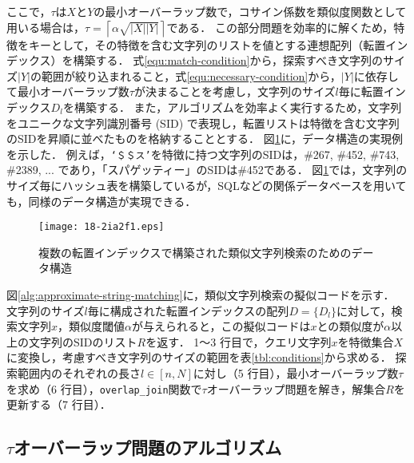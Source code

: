 \documentclass[japanese]{jnlp_JS2.0}
\begin{document}
ここで，$\tau$は$X$と$Y$の最小オーバーラップ数で，コサイン係数を類似度関数として用いる場合は，$\tau = \left\lceil \alpha \sqrt{|X||Y|} \right\rceil$である．
この部分問題を効率的に解くため，特徴をキーとして，その特徴を含む文字列のリストを値とする連想配列（転置インデックス）を構築する．
式\ref{equ:match-condition}から，探索すべき文字列のサイズ$|Y|$の範囲が絞り込まれること，式\ref{equ:necessary-condition}から，$|Y|$に依存して最小オーバーラップ数$\tau$が決まることを考慮し，文字列のサイズ$l$毎に転置インデックス$D_l$を構築する．
また，アルゴリズムを効率よく実行するため，文字列をユニークな文字列識別番号 (SID) で表現し，転置リストは特徴を含む文字列のSIDを昇順に並べたものを格納することとする．
図\ref{fig:data-structure}に，データ構造の実現例を示した．
例えば，\texttt{`＄＄ス'}を特徴に持つ文字列のSIDは，\#267, \#452, \#743, \#2389, ... であり，「スパゲッティー」のSIDは\#452である．
図\ref{fig:data-structure}では，文字列のサイズ毎にハッシュ表を構築しているが，SQLなどの関係データベースを用いても，同様のデータ構造が実現できる．

\begin{figure}[b]
    \begin{center}
\texttt{[image: 18-2ia2f1.eps]}
    \end{center}
    \caption{複数の転置インデックスで構築された類似文字列検索のためのデータ構造}
\label{fig:data-structure}
\end{figure}

図\ref{alg:approximate-string-matching}に，類似文字列検索の擬似コードを示す．
文字列のサイズ$l$毎に構成された転置インデックスの配列$D = \{D_l\}$に対して，検索文字列$x$，類似度閾値$\alpha$が与えられると，この擬似コードは$x$との類似度が$\alpha$以上の文字列のSIDのリスト$R$を返す．
1〜3 行目で，クエリ文字列$x$を特徴集合$X$に変換し，考慮すべき文字列のサイズの範囲を表\ref{tbl:conditions}から求める．
探索範囲内のそれぞれの長さ$l \in [n, N]$に対し（5 行目），最小オーバーラップ数$\tau$を求め（6 行目），{\tt overlap\_join}関数で$\tau$オーバーラップ問題を解き，解集合$R$を更新する（7 行目）．


\subsection{$\tau$オーバーラップ問題のアルゴリズム}
\end{document}
